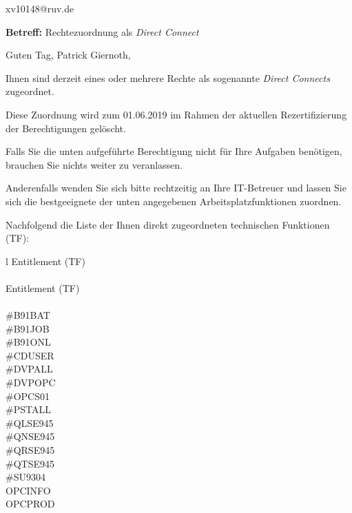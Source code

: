 \documentclass[a4paper,landscape,12pt]{letter}
\begin{document}
\begin{letter}{xv10148@ruv.de\hfill \break}
\begin{normalsize}
	\opening{\textbf{Betreff:} Rechtezuordnung als \emph{Direct Connect}}
	\begin{normalsize} \hfill
	\end{normalsize}

	\begin{normalsize}
		Guten Tag, 
	Patrick Giernoth, \hfill \break
	\end{normalsize}
	\end{normalsize}
	
\begin{normalsize}
	Ihnen sind derzeit eines oder mehrere Rechte als sogenannte \emph{Direct Connects} zugeordnet.
	
	Diese Zuordnung wird zum 01.06.2019 im Rahmen der aktuellen Rezertifizierung der Berechtigungen gelöscht.
	
	Falls Sie die unten aufgeführte Berechtigung nicht für Ihre Aufgaben benötigen, 
	brauchen Sie nichts weiter zu veranlassen.
	
	Anderenfalls wenden Sie sich bitte rechtzeitig an Ihre IT-Betreuer 
	und lassen Sie sich die bestgeeignete der unten angegebenen Arbeitsplatzfunktionen zuordnen.
	\end{normalsize}
	
\begin{normalsize}
	Nachfolgend die Liste der Ihnen direkt zugeordneten technischen Funktionen (TF):

	\begin{longtable}{l}
		Entitlement (TF) \\ \hline
		\endfirsthead
		\\\hline
		Entitlement (TF) \\ \hline
		\endhead %
		\multicolumn{1}{r@{}}{Fortsetzung \ldots}\\
		\endfoot
		\hline
		\endlastfoot
	\#B91BAT\\\#B91JOB\\\#B91ONL\\\#CDUSER\\\#DVPALL\\\#DVPOPC\\\#OPCS01\\\#PSTALL\\\#QLSE945\\\#QNSE945\\\#QRSE945\\\#QTSE945\\\#SU9304\\OPCINFO\\OPCPROD\\
	\end{longtable}
	\end{normalsize}
	

\end{letter}
\end{document}
